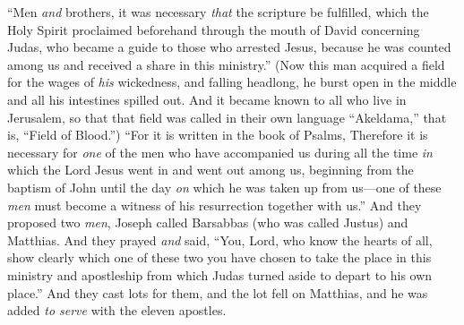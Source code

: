 \begin{biblechapter}
\verse “Men \textit{and} brothers, it was necessary \textit{that} the scripture be fulfilled, which the Holy Spirit proclaimed beforehand through the mouth of David concerning Judas, who became a guide to those who arrested Jesus,
\verse because he was counted among us and received a share in this ministry.”
\verse (Now this man acquired a field for the wages of \textit{his} wickedness, and falling headlong, he burst open in the middle and all his intestines spilled out.
\verse And it became known to all who live in Jerusalem, so that that field was called in their own language “Akeldama,” that is, “Field of Blood.”)
\verse “For it is written in the book of Psalms,
\verse Therefore it is necessary for \textit{one} of the men who have accompanied us during all the time \textit{in} which the Lord Jesus went in and went out among us,
\verse beginning from the baptism of John until the day \textit{on} which he was taken up from us—one of these \textit{men} must become a witness of his resurrection together with us.”
\verse And they proposed two \textit{men}, Joseph called Barsabbas (who was called Justus) and Matthias.
\verse And they prayed \textit{and} said, “You, Lord, who know the hearts of all, show clearly which one of these two you have chosen
\verse to take the place in this ministry and apostleship from which Judas turned aside to depart to his own place.”
\verse And they cast lots for them, and the lot fell on Matthias, and he was added \textit{to serve} with the eleven apostles.
\end{biblechapter}

